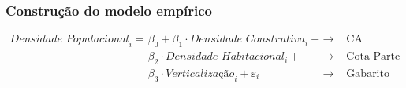 \documentclass[%
    8pt, 
    aspectratio=169,
]{beamer}
\begin{document}
\begin{frame}
    \frametitle{Construção do modelo empírico}
    \begin{align}
        \textit{Densidade Populacional}_i =
        &\beta_0 + \beta_1 \cdot \textit{Densidade Construtiva}_i + & \rightarrow & \text{ CA}\nonumber\\
        &\beta_2 \cdot\textit{Densidade Habitacional}_i + & \rightarrow & \text{ Cota Parte} \\
        &\beta_3\cdot\textit{Verticalização}_i + \varepsilon_i & \rightarrow & \text{ Gabarito}\nonumber
        \label{eq:reg}
    \end{align}

    \vspace{1cm}


\end{frame}
\end{document}
